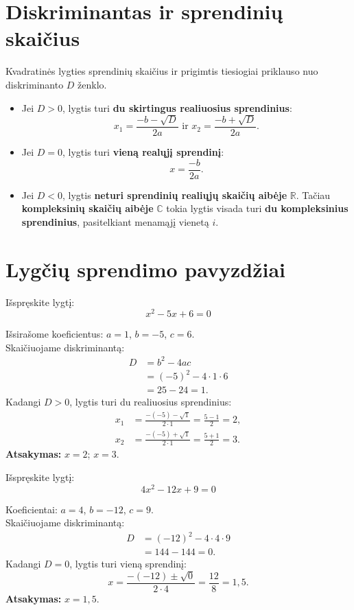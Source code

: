 \documentclass[11pt,a4paper]{scrartcl}
\begin{document}
\section{Diskriminantas ir sprendinių skaičius}

Kvadratinės lygties sprendinių skaičius ir prigimtis tiesiogiai priklauso nuo diskriminanto $D$ ženklo.

\begin{itemize}
    \item Jei $D > 0$, lygtis turi \textbf{du skirtingus realiuosius sprendinius}: $$x_1 = \frac{-b - \sqrt{D}}{2a} \text{ ir } x_2 = \frac{-b + \sqrt{D}}{2a}.$$
    \item Jei $D = 0$, lygtis turi \textbf{vieną realųjį sprendinį}: $$x = \frac{-b}{2a}.$$
    \item Jei $D < 0$, lygtis \textbf{neturi sprendinių realiųjų skaičių aibėje} $\mathbb{R}$. Tačiau \textbf{kompleksinių skaičių aibėje} $\mathbb{C}$ tokia lygtis visada turi \textbf{du kompleksinius sprendinius}, pasitelkiant menamąjį vienetą $i$.
\end{itemize}

\section{Lygčių sprendimo pavyzdžiai}

\begin{example}
Išspręskite lygtį:
\[ x^2 - 5x + 6 = 0 \]
\end{example}
\begin{solution}
Išsirašome koeficientus: $a=1$, $b=-5$, $c=6$.\\
Skaičiuojame diskriminantą:
\[
\begin{aligned}
D &= b^2 - 4ac \\
&= (-5)^2 - 4 \cdot 1 \cdot 6 \\
&= 25 - 24 = 1.
\end{aligned}
\]
Kadangi $D > 0$, lygtis turi du realiuosius sprendinius:
\[
\begin{aligned}
x_1 &= \frac{-(-5) - \sqrt{1}}{2 \cdot 1} = \frac{5 - 1}{2} = 2, \\
x_2 &= \frac{-(-5) + \sqrt{1}}{2 \cdot 1} = \frac{5 + 1}{2} = 3.
\end{aligned}
\]
\textbf{Atsakymas:} $x=2$; $x=3$.
\end{solution}

\begin{example}
Išspręskite lygtį:
\[ 4x^2 - 12x + 9 = 0 \]
\end{example}
\begin{solution}
Koeficientai: $a=4$, $b=-12$, $c=9$.\\
Skaičiuojame diskriminantą:
\[
\begin{aligned}
D &= (-12)^2 - 4 \cdot 4 \cdot 9 \\
&= 144 - 144 = 0.
\end{aligned}
\]
Kadangi $D = 0$, lygtis turi vieną sprendinį:
\[ x = \frac{-(-12) \pm \sqrt{0}}{2 \cdot 4} = \frac{12}{8} = 1,5. \]
\textbf{Atsakymas:} $x=1,5$.
\end{solution}
\end{document}
